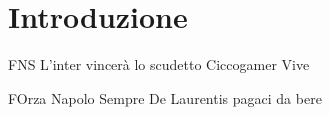 \chapter*{Introduzione}
FNS
L'inter vincerà lo scudetto
Ciccogamer Vive

FOrza Napolo Sempre
De Laurentis pagaci da bere
